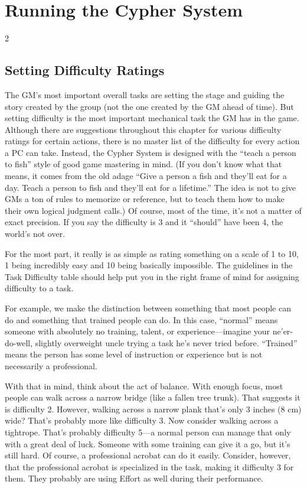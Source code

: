 \part{Running the Cypher System}

\begin{multicols}{2}

\chapter{Setting Difficulty Ratings}

The GM’s most important overall tasks are setting the stage and guiding the story created by the group (not the one created by the GM ahead of time). But setting difficulty is the most important mechanical task the GM has in the game. Although there are suggestions throughout this chapter for various difficulty ratings for certain actions, there is no master list of the difficulty for every action a PC can take. Instead, the Cypher System is designed with the “teach a person to fish” style of good game mastering in mind. (If you don’t know what that means, it comes from the old adage “Give a person a fish and they’ll eat for a day. Teach a person to fish and they’ll eat for a lifetime.” The idea is not to give GMs a ton of rules to memorize or reference, but to teach them how to make their own logical judgment calls.) Of course, most of the time, it’s not a matter of exact precision. If you say the difficulty is 3 and it “should” have been 4, the world’s not over.

For the most part, it really is as simple as rating something on a scale of 1 to 10, 1 being incredibly easy and 10 being basically impossible. The guidelines in the Task Difficulty table should help put you in the right frame of mind for assigning difficulty to a task.

For example, we make the distinction between something that most people can do and something that trained people can do. In this case, “normal” means someone with absolutely no training, talent, or experience—imagine your ne’er-do-well, slightly overweight uncle trying a task he’s never tried before. “Trained” means the person has some level of instruction or experience but is not necessarily a professional.

With that in mind, think about the act of balance. With enough focus, most people can walk across a narrow bridge (like a fallen tree trunk). That suggests it is difficulty 2. However, walking across a narrow plank that’s only 3 inches (8 cm) wide? That’s probably more like difficulty 3. Now consider walking across a tightrope. That’s probably difficulty 5—a normal person can manage that only with a great deal of luck. Someone with some training can give it a go, but it’s still hard. Of course, a professional acrobat can do it easily. Consider, however, that the professional acrobat is specialized in the task, making it difficulty 3 for them. They probably are using Effort as well during their performance.


\end{multicols}
